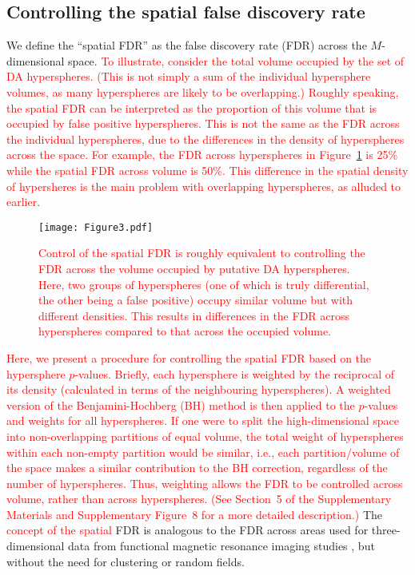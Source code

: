 \documentclass{article}
\newcommand\revised[1]{\textcolor{red}{#1}}
\newcommand{\suppfdr}{5}
\newcommand{\suppfigfdr}{8}
\begin{document}
\subsection{Controlling the spatial false discovery rate}
We define the ``spatial FDR'' as the false discovery rate (FDR) across the $M$-dimensional space.
\revised{To illustrate, consider the total volume occupied by the set of DA hyperspheres.
    (This is not simply a sum of the individual hypersphere volumes, as many hyperspheres are likely to be overlapping.)
    Roughly speaking, the spatial FDR can be interpreted as the proportion of this volume that is occupied by false positive hyperspheres.
    This is not the same as the FDR across the individual hyperspheres, due to the differences in the density of hyperspheres across the space.
    For example, the FDR across hyperspheres in Figure~\ref{fig:fdrexample} is 25\% while the spatial FDR across volume is 50\%.
    This difference in the spatial density of hypersheres is the main problem with overlapping hyperspheres, as alluded to earlier.}

\begin{figure}[bt]
\begin{center}
\texttt{[image: Figure3.pdf]}
\end{center}
\caption{\revised{Control of the spatial FDR is roughly equivalent to controlling the FDR across the volume occupied by putative DA hyperspheres.
    Here, two groups of hyperspheres (one of which is truly differential, the other being a false positive) occupy similar volume but with different densities.
This results in differences in the FDR across hyperspheres compared to that across the occupied volume.
}}
\label{fig:fdrexample}
\end{figure}

\revised{Here, we present a procedure for controlling the spatial FDR based on the hypersphere $p$-values.
    Briefly, each hypersphere is weighted by the reciprocal of its density (calculated in terms of the neighbouring hyperspheres).
    A weighted version of the Benjamini-Hochberg (BH) method \cite{benjamini1997multiple} is then applied to the $p$-values and weights for all hyperspheres.
    If one were to split the high-dimensional space into non-overlapping partitions of equal volume, the total weight of hyperspheres within each non-empty partition would be similar, i.e., each partition/volume of the space makes a similar contribution to the BH correction, regardless of the number of hyperspheres.
    Thus, weighting allows the FDR to be controlled across volume, rather than across hyperspheres.
(See Section~\suppfdr{} of the Supplementary Materials and Supplementary Figure~\suppfigfdr{} for a more detailed description.)}
    The \revised{concept of the spatial} FDR is analogous to the FDR across areas used for three-dimensional data from functional magnetic resonance imaging studies \cite{pacifico2004false,benjamini2007false}, but without the need for clustering or random fields.
\end{document}
